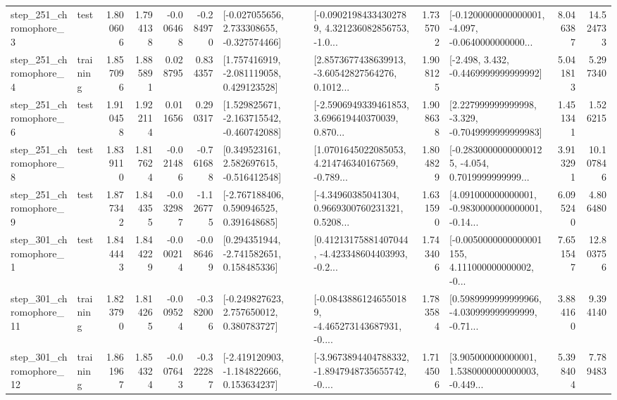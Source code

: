 \begin{tabular}{llrrrrllrlrr}
   step\_251\_chromophore\_3 &      test &      1.800606 &    1.794138 &     -0.006468 & -0.284970 &   [-0.027055656, 2.733308655, -0.327574466] &  [-0.09021984334302789, 4.321236082856753, -1.0... &       1.735702 &  [-0.1200000000000001, -4.097, -0.0640000000000... &            8.046387 &         14.524733 \\
   step\_251\_chromophore\_4 &  training &      1.857096 &    1.885891 &      0.028795 &  0.834357 &    [1.757416919, -2.081119058, 0.429123528] &  [2.8573677438639913, -3.60542827564276, 0.1012... &       1.908125 &               [-2.498, 3.432, -0.4469999999999992] &            5.041813 &          5.297340 \\
   step\_251\_chromophore\_6 &      test &      1.910458 &    1.922114 &      0.011656 &  0.290317 &   [1.529825671, -2.163715542, -0.460742088] &  [-2.5906949339461853, 3.696619440370039, 0.870... &       1.908638 &   [2.227999999999998, -3.329, -0.7049999999999983] &            1.451341 &          1.526215 \\
   step\_251\_chromophore\_8 &      test &      1.839110 &    1.817624 &     -0.021486 & -0.761688 &    [0.349523161, 2.582697615, -0.516412548] &  [1.0701645022085053, 4.214746340167569, -0.789... &       1.804829 &  [-0.28300000000000125, -4.054, 0.7019999999999... &            3.913291 &         10.107846 \\
   step\_251\_chromophore\_9 &      test &      1.877342 &    1.844355 &     -0.032987 & -1.126775 &    [-2.767188406, 0.590946525, 0.391648685] &  [-4.34960385041304, 0.9669300760231321, 0.5208... &       1.631590 &  [4.091000000000001, -0.9830000000000001, -0.14... &            6.095240 &          4.806480 \\
   step\_301\_chromophore\_1 &      test &      1.844443 &    1.844229 &     -0.000214 & -0.086469 &    [0.294351944, -2.741582651, 0.158485336] &  [0.41213175881407044, -4.423348604403993, -0.2... &       1.743406 &  [-0.0050000000000001155, 4.111000000000002, -0... &            7.651547 &         12.803756 \\
  step\_301\_chromophore\_11 &  training &      1.823790 &    1.814265 &     -0.009524 & -0.382006 &    [-0.249827623, 2.757650012, 0.380783727] &  [-0.08438861246550189, -4.465273143687931, -0.... &       1.783584 &  [0.5989999999999966, -4.030999999999999, -0.71... &            3.884160 &          9.394140 \\
  step\_301\_chromophore\_12 &  training &      1.861967 &    1.854324 &     -0.007643 & -0.322287 &   [-2.419120903, -1.184822666, 0.153634237] &  [-3.9673894404788332, -1.8947948735655742, -0.... &       1.714506 &  [3.905000000000001, 1.5380000000000003, -0.449... &            5.398404 &          7.789483 \\

\end{tabular}
